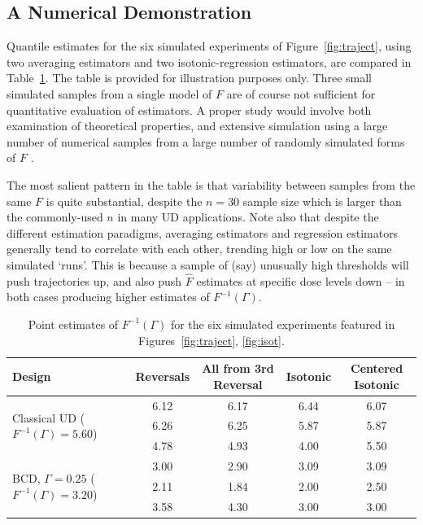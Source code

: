 \subsection{A Numerical Demonstration}

Quantile estimates for the six simulated experiments of Figure~\ref{fig:traject}, using two averaging estimators and two isotonic-regression estimators, are compared in Table~\ref{tbl:est1}.  The table is provided for illustration purposes only. Three small simulated samples from a single model of $F$ are of course not sufficient for quantitative evaluation of estimators. A proper study would involve both examination of theoretical properties, and extensive simulation using a large number of numerical samples from a large number of randomly simulated forms of $F$ \citep[online supplement]{Oron:Hoff:smal:2013}.

The most salient pattern in the table is that variability between samples from the same $F$ is quite substantial, despite the $n=30$ sample size which is larger than the commonly-used $n$ in many UD applications. Note also that despite the different estimation paradigms, averaging estimators and regression estimators generally tend to correlate with each other, trending high or low on the same simulated `runs'. This is because a sample of (say) unusually high thresholds will push trajectories up, and also push $\hat{F}$ estimates at specific dose levels down -- in both cases producing higher estimates of  $F^{-1}(\Gamma)$.

\begin{table}[!ht]
\caption{Point estimates of $F^{-1}(\Gamma)$ for the six simulated experiments featured in Figures~\ref{fig:traject}, \ref{fig:isot}.}\label{tbl:est1}
\begin{center}
\begin{tabular}{p{3cm}cccc}
  \toprule
Design & Reversals & All from 3rd Reversal & Isotonic & Centered Isotonic \\
  \midrule
\multirow{3}{3cm}{Classical UD ($F^{-1}(\Gamma)=5.60$)} & 6.12 & 6.17 & 6.44 & 6.07 \\
   & 6.26 & 6.25 & 5.87 & 5.87 \\
   & 4.78 & 4.93 & 4.00 & 5.50 \\
\midrule
\multirow{3}{3cm}{BCD, $\Gamma=0.25$ ($F^{-1}(\Gamma)=3.20$)} & 3.00 & 2.90 & 3.09 & 3.09 \\
   & 2.11 & 1.84 & 2.00 & 2.50 \\
   & 3.58 & 4.30 & 3.00 & 3.00 \\
\bottomrule
\end{tabular}
\end{center}
\end{table}


